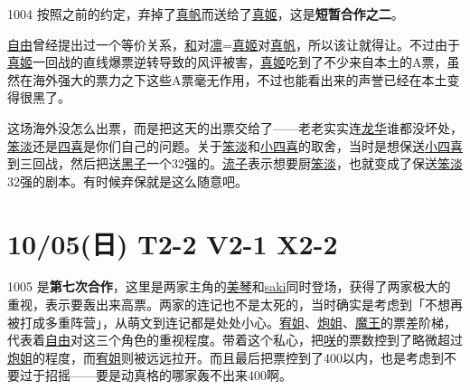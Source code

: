 
1004 按照之前的约定，弃掉了\uline{真帆}而送给了\uline{真姬}，这是\textbf{短暂合作之二}。

\uline{自由}曾经提出过一个等价关系，\uline{和}对\uline{凛}=\uline{真姬}对\uline{真帆}，所以该让就得让。不过由于\uline{真姬}一回战的直线爆票逆转导致的风评被害，\uline{真姬}吃到了不少来自本土的A票，虽然在海外强大的票力之下这些A票毫无作用，不过也能看出来的声誉已经在本土变得很黑了。

这场海外没怎么出票，而是把这天的出票交给了——老老实实连\uline{龙华}谁都没坏处，\uline{笨淡}还是\uline{四喜}是你们自己的问题。关于\uline{笨淡}和\uline{小四喜}的取舍，当时是想保送\uline{小四喜}到三回战，然后把送\uline{黑子}一个32强的。\uline{流子}表示想要厨\uline{笨淡}，也就变成了保送\uline{笨淡}32强的剧本。有时候弃保就是这么随意吧。

\section{10/05(日) T2-2 V2-1 X2-2}


1005 是\textbf{第七次合作}，这里是两家主角的\uline{美琴}和\uline{saki}同时登场，获得了两家极大的重视，表示要轰出来高票。两家的连记也不是太死的，当时确实是考虑到「不想再被打成多重阵营」，从萌文到连记都是处处小心。\uline{宥姐}、\uline{炮姐}、\uline{魔王}的票差阶梯，代表着\uline{自由}对这三个角色的重视程度。带着这个私心，把\uline{咲}的票数控到了略微超过\uline{炮姐}的程度，而\uline{宥姐}则被远远拉开。而且最后把票控到了400以内，也是考虑到不要过于招摇——要是动真格的哪家轰不出来400啊。

